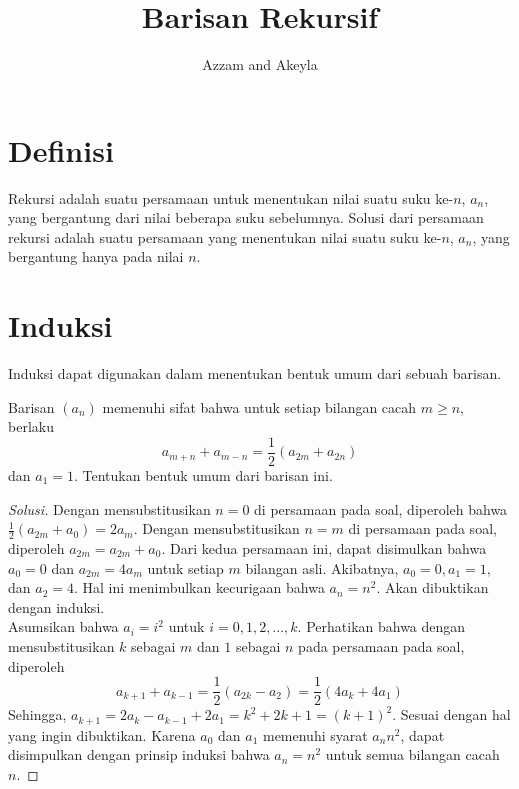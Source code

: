 \documentclass[11pt]{scrartcl}
\title{Barisan Rekursif}
\author{Azzam and Akeyla}
\begin{document}
\maketitle

\renewcommand*\contentsname{Daftar Isi}
\tableofcontents

\newpage

\section{Definisi}
Rekursi adalah suatu persamaan untuk menentukan nilai suatu suku ke-$n$, $a_n$, yang bergantung dari nilai beberapa suku sebelumnya. Solusi dari persamaan rekursi adalah suatu persamaan yang menentukan nilai suatu suku ke-$n$, $a_n$, yang bergantung hanya pada nilai $n$.


\section{Induksi}
 Induksi dapat digunakan dalam menentukan bentuk umum dari sebuah barisan.
 
 \begin{example}
     Barisan $(a_n)$ memenuhi sifat bahwa untuk setiap bilangan cacah $m\geq n$, berlaku \[a_{m+n} + a_{m-n} = \frac{1}{2}(a_{2m} + a_{2n})\] dan $a_1 = 1$. Tentukan bentuk umum dari barisan ini.
 \end{example}
 
 \begin{proof}[Solusi]
     Dengan mensubstitusikan $n = 0$ di persamaan pada soal, diperoleh bahwa $\frac{1}{2}(a_{2m} + a_0) = 2a_m$. Dengan mensubstitusikan $n = m$ di persamaan pada soal, diperoleh $a_{2m} = a_{2m} + a_0$. Dari kedua persamaan ini, dapat disimulkan bahwa $a_0 = 0$ dan $a_{2m} = 4a_m$ untuk setiap $m$ bilangan asli. Akibatnya, $a_0 = 0, a_1 = 1,$ dan $a_2 = 4$. Hal ini menimbulkan kecurigaan bahwa $a_n = n^2$. Akan dibuktikan dengan induksi.\\
     Asumsikan bahwa $a_i = i^2$ untuk $i = 0, 1, 2,..., k$. Perhatikan bahwa dengan mensubstitusikan $k$ sebagai $m$ dan $1$ sebagai $n$ pada persamaan pada soal, diperoleh \[a_{k + 1} + a_{k - 1} = \frac{1}{2}(a_{2k} - a_2) = \frac{1}{2}(4a_k + 4a_1)\]
     Sehingga, $a_{k + 1} = 2a_k - a_{k - 1} + 2a_1 = k^2 + 2k + 1 = (k+1)^2$. Sesuai dengan hal yang ingin dibuktikan. Karena $a_0$ dan $a_1$ memenuhi syarat $a_n  n^2$, dapat disimpulkan dengan prinsip induksi bahwa $a_n = n^2$ untuk semua bilangan cacah $n$.
 \end{proof}
 
\end{document}
